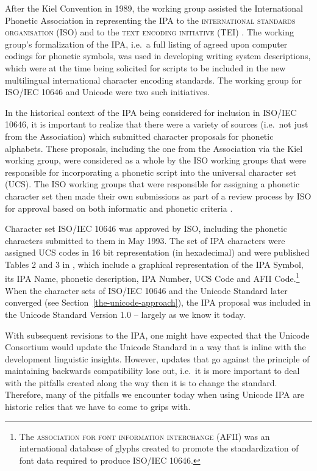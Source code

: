 After the Kiel Convention in 1989, the working group assisted
the International Phonetic Association in representing the IPA to the
\textsc{international standards organisation} (ISO) and to the \textsc{text
encoding initiative} (TEI) \citep{EslingGaylord1993}. The working group's
formalization of the IPA, i.e.\ a full listing of agreed upon computer codings
for phonetic symbols, was used in developing writing system descriptions, which
were at the time being solicited for scripts to be included in the new
multilingual international character encoding standards. The working group for
ISO/IEC 10646 and Unicode were two such initiatives.

In the historical context of the IPA being considered for inclusion in 
ISO/IEC 10646, it is important to realize that there were a variety of 
sources (i.e.\ not just from the Association) which submitted character 
proposals for phonetic alphabets. These proposals, including the one from the 
Association via the Kiel working group, were considered as a whole by 
the ISO working groups that were responsible for incorporating a phonetic 
script into the universal character set (UCS). The ISO working groups that 
were responsible for assigning a phonetic character set then made their 
own submissions as part of a review process by ISO for approval based on 
both informatic and phonetic criteria \citep[86]{EslingGaylord1993}. 

Character set ISO/IEC 10646 was approved by ISO, including the phonetic
characters submitted to them in May 1993. The set of IPA characters were
assigned UCS codes in 16 bit representation (in hexadecimal) and were published
Tables 2 and 3 in \cite{EslingGaylord1993}, which include a graphical
representation of the IPA Symbol, its IPA Name, phonetic description, IPA
Number, UCS Code and AFII Code.\footnote{The \textsc{association for font
information interchange} (AFII) was an international database of glyphs created
to promote the standardization of font data required to produce ISO/IEC 10646.} When the
character sets of ISO/IEC 10646 and the Unicode Standard later converged (see
Section~\ref{the-unicode-approach}), the IPA proposal was
included in the Unicode Standard Version 1.0 -- largely as we know it
today.

With subsequent revisions to the IPA, one might have expected that the Unicode
Consortium would update the Unicode Standard in a way that is inline with the
development linguistic insights. However, updates that go against the principle
of maintaining backwards compatibility lose out, i.e.\ it is more important to
deal with the pitfalls created along the way then it is to change the standard.
Therefore, many of the pitfalls we encounter today when using Unicode IPA are
historic relics that we have to come to grips with.

